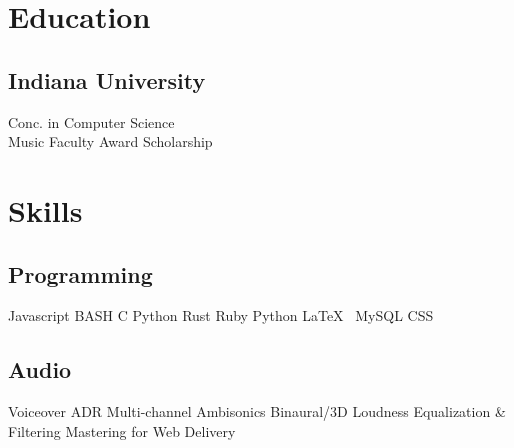 \documentclass[letterpaper]{deedy-resume} %
\begin{document}
\begin{minipage}[t]{0.33\textwidth} %


\section{Education} 

\subsection{Indiana University}

Conc. in Computer Science \\
Music Faculty Award Scholarship

\sectionspace %


\section{Skills}

\subsection{Programming}

Javascript \textbullet{} BASH \textbullet{} C \textbullet{} Python \textbullet{} Rust \textbullet{}
 Ruby \textbullet{} Python \textbullet{} \LaTeX\ \textbullet{} MySQL \textbullet{} CSS
 
\sectionspace %
 
\subsection{Audio}


Voiceover \textbullet{} ADR \textbullet{} Multi-channel \textbullet{} Ambisonics \textbullet{} Binaural/3D \textbullet{}
 Loudness \textbullet{} Equalization \& Filtering \textbullet{} Mastering for Web Delivery


\end{minipage}
\end{document}
